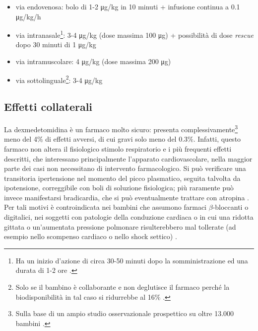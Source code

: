 \begin{itemize}
    \item via endovenosa: bolo di 1-2 \unit{\ug/kg} in 10 minuti + infusione continua a 0.1 \unit{\ug/kg/h}
    \item via intranasale\footnote{Ha un inizio d'azione di circa 30-50 minuti dopo la somministrazione ed una durata di 1-2 ore \cite{Simeupsedazione}.}: 3-4 \unit{\ug/kg} (dose massima 100 \unit{\ug}) + possibilità di dose \emph{rescue} dopo 30 minuti di 1 \unit{\ug/kg}
    \item via intramuscolare: 4 \unit{\ug/kg} (dose massima 200 \unit{\ug})
    \item via sottolinguale\footnote{Solo se il bambino è collaborante e non deglutisce il farmaco perché la biodisponibilità in tal caso si ridurrebbe al 16$\%$ \cite{Weerink2017}.}: 3-4 \unit{\ug/kg}
\end{itemize}

\subsection*{Effetti collaterali}

La dexmedetomidina è un farmaco molto sicuro: presenta complessivamente\footnote{Sulla base di un ampio studio osservazionale prospettico su oltre 13.000 bambini \cite{Sulton2016}.} meno del 4$\%$ di effetti avversi, di cui gravi solo meno del 0.3$\%$. Infatti, questo farmaco non altera il fisiologico stimolo respiratorio e i più frequenti effetti descritti, che interessano principalmente l'apparato cardiovascolare, nella maggior parte dei casi non necessitano di intervento farmacologico. Si può verificare una transitoria ipertensione nel momento del picco plasmatico, seguita talvolta da ipotensione, correggibile con boli di soluzione fisiologica; più raramente può invece manifestarsi bradicardia, che si può eventualmente trattare con atropina \cite{Sulton2016}. Per tali motivi è controindicata nei bambini che assumono farmaci $\beta$-bloccanti o digitalici, nei soggetti con patologie della conduzione cardiaca o in cui una ridotta gittata o un'aumentata pressione polmonare risulterebbero mal tollerate (ad esempio nello scompenso cardiaco o nello shock settico) \cite{Uptodatepharmacology, Simeupsedazione}. 